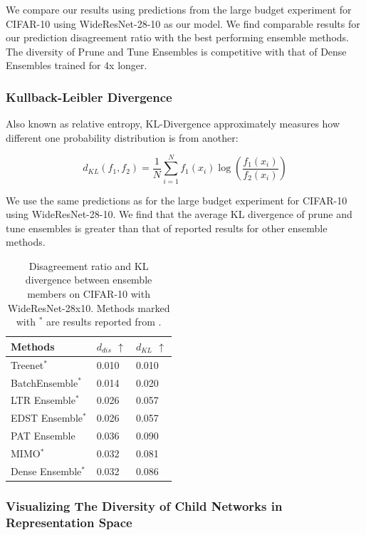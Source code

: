 \documentclass[letterpaper]{article} %
\begin{document}
We compare our results using predictions from the large budget experiment for CIFAR-10 using WideResNet-28-10 as our model. We find comparable results for our prediction disagreement ratio with the best performing ensemble methods. The diversity of Prune and Tune Ensembles is competitive with that of Dense Ensembles trained for 4x longer.

\subsubsection{Kullback-Leibler Divergence}

Also known as relative entropy, KL-Divergence approximately measures how different one probability distribution is from another:

\[
d_{KL}(f_1, f_2) = \frac{1}{N} \sum_{i=1}^N f_1(x_i) \log \left( \frac{f_1(x_i)}{f_2(x_i)} \right)
\]

We use the same predictions as for the large budget experiment for CIFAR-10 using WideResNet-28-10. We find that the average KL divergence of prune and tune ensembles is greater than that of reported results for other ensemble methods.

\begin{table}[t]
\begin{tabularx}{\columnwidth}{X l l}
\toprule
Methods & $d_{dis}$ $\uparrow$ & $d_{KL}$ $\uparrow$ \\
\midrule
Treenet$^*$ & 0.010 & 0.010 \\
BatchEnsemble$^*$ & 0.014 & 0.020 \\
LTR Ensemble$^*$ & 0.026 & 0.057 \\
EDST Ensemble$^*$ & 0.026 & 0.057 \\
PAT Ensemble & 0.036 & 0.090 \\
\midrule
MIMO$^*$ & 0.032 & 0.081 \\
Dense Ensemble$^*$ & 0.032 & 0.086 \\
\bottomrule
\end{tabularx}
\caption{Disagreement ratio and KL divergence between ensemble members on CIFAR-10 with WideResNet-28x10. Methods marked with $^*$ are results reported from \cite{liu2021freetickets}.}
\end{table}

\subsubsection{Visualizing The Diversity of Child Networks in Representation Space}
\end{document}
